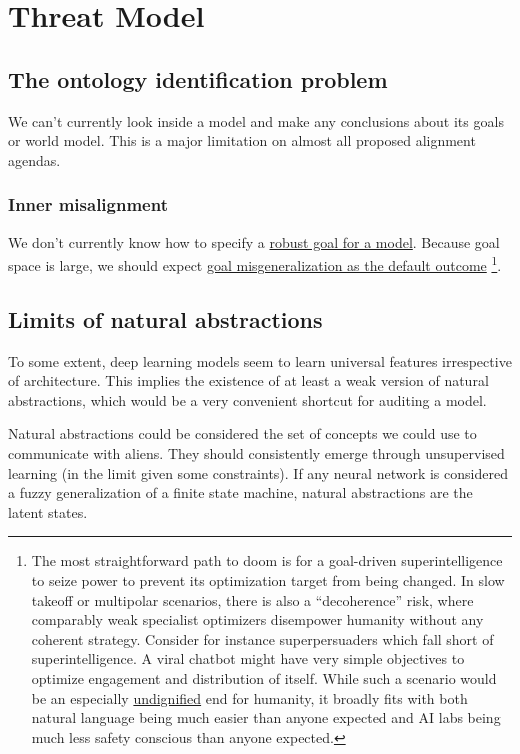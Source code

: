 
\section{Threat Model}

\subsection{The ontology identification problem}
We can't currently look inside a model and make any conclusions about its goals or world model.
This is a major limitation on almost all proposed alignment agendas.

\subsubsection{Inner misalignment}
We don't currently know how to specify a \href{https://arbital.com/p/diamond_maximizer/}{robust goal for a model}.
Because goal space is large, we should expect
\href{https://www.lesswrong.com/s/r9tYkB2a8Fp4DN8yB/p/FkgsxrGf3QxhfLWHG}{goal misgeneralization as the default outcome}
\footnote{The most straightforward path to doom is for a goal-driven superintelligence to seize power to prevent its optimization target from being changed.
In slow takeoff or multipolar scenarios, there is also a ``decoherence'' risk, 
where comparably weak specialist optimizers disempower humanity without any coherent strategy.
Consider for instance superpersuaders which fall short of superintelligence.
A viral chatbot might have very simple objectives to optimize engagement and distribution of itself.
While such a scenario would be an especially 
\href{https://www.lesswrong.com/posts/mSF4KTxAGRG3EHmhb/ai-x-risk-approximately-ordered-by-embarrassment}{undignified} 
end for humanity,
it broadly fits with both natural language being much easier than anyone expected and
AI labs being much less safety conscious than anyone expected.}.


\subsection{Limits of natural abstractions}
To some extent, deep learning models seem to learn universal features irrespective of architecture\cite{chughtai2023}.
This implies the existence of at least a weak version of
natural abstractions\cite{lang2023},
which would be a very convenient shortcut for auditing a model.

Natural abstractions could be considered the set of concepts we could use to communicate with aliens. 
They should consistently emerge through unsupervised learning (in the limit given some constraints).
If any neural network is considered a fuzzy generalization of a finite state machine, 
natural abstractions are the latent states.

